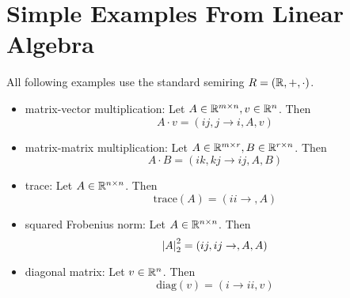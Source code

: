 \section{Simple Examples From Linear Algebra}

All following examples use the standard semiring $R = (\mathbb{R}, +, \cdot)$.
\begin{itemize}
    \item matrix-vector multiplication: Let $A \in \mathbb{R}^{m \times n}, v \in \mathbb{R}^{n}$. Then
          $$A \cdot v = (ij, j \rightarrow i, A, v)$$
    \item matrix-matrix multiplication: Let $A \in \mathbb{R}^{m \times r}, B \in \mathbb{R}^{r \times n}$. Then
          $$A \cdot B = (ik, kj \rightarrow ij, A, B)$$
    \item trace: Let $A \in \mathbb{R}^{n \times n}$. Then
          $$\text{trace}(A) = (ii \rightarrow, A)$$
    \item squared Frobenius norm: Let $A \in \mathbb{R}^{n \times n}$. Then
          $$\left\lvert A \right\rvert_2^2 = (ij, ij \rightarrow,A,A)$$
    \item diagonal matrix: Let $v \in \mathbb{R}^{n}$. Then
          $$\text{diag}(v) = (i \rightarrow ii, v)$$
\end{itemize}